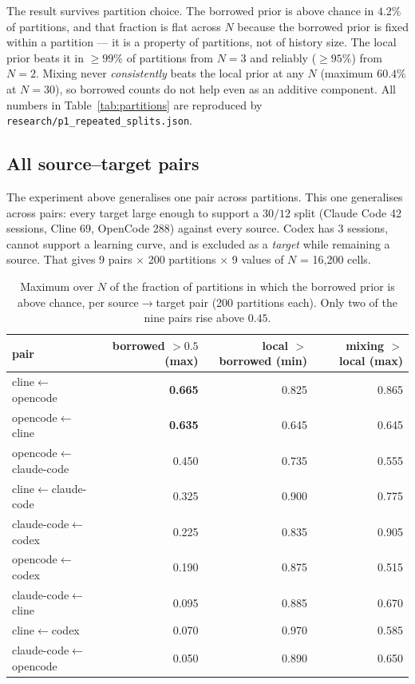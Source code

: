 \documentclass[11pt]{article}
\begin{document}
The result survives partition choice. The borrowed prior is above chance in
$4.2\%$ of partitions, and that fraction is flat across $N$ because the borrowed
prior is fixed within a partition --- it is a property of partitions, not of
history size. The local prior beats it in $\geq 99\%$ of partitions from $N=3$
and reliably ($\geq 95\%$) from $N=2$. Mixing never \emph{consistently} beats the
local prior at any $N$ (maximum $60.4\%$ at $N=30$), so borrowed counts do not
help even as an additive component. All numbers in
Table~\ref{tab:partitions} are reproduced by
\texttt{research/p1\_repeated\_splits.json}.

\subsection{All source--target pairs}
\label{sec:allpairs}

The experiment above generalises one pair across partitions. This one
generalises across pairs: every target large enough to support a $30/12$ split
(Claude Code 42 sessions, Cline 69, OpenCode 288) against every source. Codex
has 3 sessions, cannot support a learning curve, and is excluded as a
\emph{target} while remaining a source. That gives 9 pairs $\times$ 200
partitions $\times$ 9 values of $N$ = 16{,}200 cells.

\begin{table}[t]
\centering
\caption{Maximum over $N$ of the fraction of partitions in which the borrowed
prior is above chance, per source$\to$target pair (200 partitions each). Only
two of the nine pairs rise above $0.45$.}
\label{tab:allpairs}
\small
\begin{tabular}{lrrr}
\toprule
pair & borrowed $>0.5$ (max) & local $>$ borrowed (min) & mixing $>$ local (max) \\
\midrule
cline$\leftarrow$opencode   & \textbf{0.665} & 0.825 & 0.865 \\
opencode$\leftarrow$cline   & \textbf{0.635} & 0.645 & 0.645 \\
opencode$\leftarrow$claude-code & 0.450 & 0.735 & 0.555 \\
cline$\leftarrow$claude-code & 0.325 & 0.900 & 0.775 \\
claude-code$\leftarrow$codex & 0.225 & 0.835 & 0.905 \\
opencode$\leftarrow$codex   & 0.190 & 0.875 & 0.515 \\
claude-code$\leftarrow$cline & 0.095 & 0.885 & 0.670 \\
cline$\leftarrow$codex      & 0.070 & 0.970 & 0.585 \\
claude-code$\leftarrow$opencode & 0.050 & 0.890 & 0.650 \\
\bottomrule
\end{tabular}
\end{table}
\end{document}
